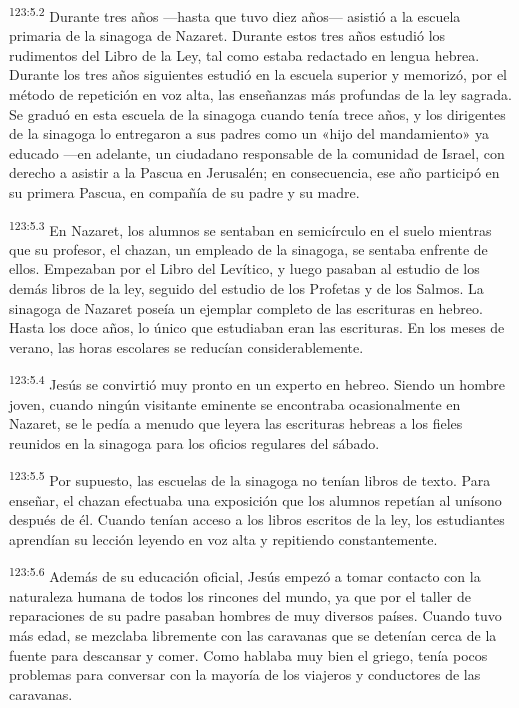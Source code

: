 \par
\textsuperscript{123:5.2} Durante tres años ---hasta que tuvo diez años--- asistió a la escuela primaria de la sinagoga de Nazaret. Durante estos tres años estudió los rudimentos del Libro de la Ley, tal como estaba redactado en lengua hebrea. Durante los tres años siguientes estudió en la escuela superior y memorizó, por el método de repetición en voz alta, las enseñanzas más profundas de la ley sagrada. Se graduó en esta escuela de la sinagoga cuando tenía trece años, y los dirigentes de la sinagoga lo entregaron a sus padres como un «hijo del mandamiento» ya educado ---en adelante, un ciudadano responsable de la comunidad de Israel, con derecho a asistir a la Pascua en Jerusalén; en consecuencia, ese año participó en su primera Pascua, en compañía de su padre y su madre.

\par
\textsuperscript{123:5.3} En Nazaret, los alumnos se sentaban en semicírculo en el suelo mientras que su profesor, el chazan, un empleado de la sinagoga, se sentaba enfrente de ellos. Empezaban por el Libro del Levítico, y luego pasaban al estudio de los demás libros de la ley, seguido del estudio de los Profetas y de los Salmos. La sinagoga de Nazaret poseía un ejemplar completo de las escrituras en hebreo. Hasta los doce años, lo único que estudiaban eran las escrituras. En los meses de verano, las horas escolares se reducían considerablemente.

\par
\textsuperscript{123:5.4} Jesús se convirtió muy pronto en un experto en hebreo. Siendo un hombre joven, cuando ningún visitante eminente se encontraba ocasionalmente en Nazaret, se le pedía a menudo que leyera las escrituras hebreas a los fieles reunidos en la sinagoga para los oficios regulares del sábado.

\par
\textsuperscript{123:5.5} Por supuesto, las escuelas de la sinagoga no tenían libros de texto. Para enseñar, el chazan efectuaba una exposición que los alumnos repetían al unísono después de él. Cuando tenían acceso a los libros escritos de la ley, los estudiantes aprendían su lección leyendo en voz alta y repitiendo constantemente.

\par
\textsuperscript{123:5.6} Además de su educación oficial, Jesús empezó a tomar contacto con la naturaleza humana de todos los rincones del mundo, ya que por el taller de reparaciones de su padre pasaban hombres de muy diversos países. Cuando tuvo más edad, se mezclaba libremente con las caravanas que se detenían cerca de la fuente para descansar y comer. Como hablaba muy bien el griego, tenía pocos problemas para conversar con la mayoría de los viajeros y conductores de las caravanas.


